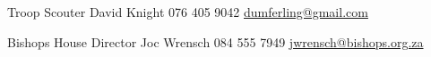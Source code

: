 

\begin{cventries}

\begin{multicols}{2}
    \begin{minipage}{0.45\textwidth}
        \cventry
{Troop Scouter} %
{David Knight} %
{076 405 9042} %
{\href{mailto:dumferling@gmail.com}{dumferling@gmail.com}} %
{}    
    \end{minipage}
    


\columnbreak

\begin{minipage}{0.45\textwidth}
    \cventry
{Bishops House Director} %
{Joc Wrensch} %
{084 555 7949} %
{\href{mailto:jwrensch@bishops.org.za}{jwrensch@bishops.org.za}} %
{}    
\end{minipage}

    
\end{multicols}


\end{cventries}
